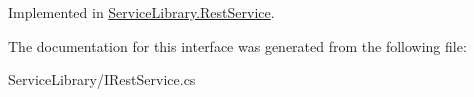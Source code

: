 Implemented in \hyperlink{class_service_library_1_1_rest_service_a7623f407a00d3bc2f93b12168c7674b5}{Service\-Library.\-Rest\-Service}.



The documentation for this interface was generated from the following file\-:\begin{DoxyCompactItemize}
\item 
Service\-Library/I\-Rest\-Service.\-cs\end{DoxyCompactItemize}
